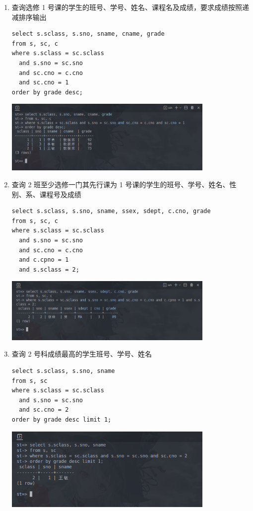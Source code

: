 \documentclass[hyperref,UTF8,12pt,a4paper]{ctexart}
\begin{document}
\begin{enumerate}
\item 查询选修 1 号课的学生的班号、学号、姓名、课程名及成绩，要求成绩按照递减排序输出

\begin{verbatim}
select s.sclass, s.sno, sname, cname, grade
from s, sc, c
where s.sclass = sc.sclass
  and s.sno = sc.sno
  and sc.cno = c.cno
  and sc.cno = 1
order by grade desc;
\end{verbatim}

\begin{center}
\includegraphics[width=0.8\textwidth]{16.png}
\end{center}

\item 查询 2 班至少选修一门其先行课为 1 号课的学生的班号、学号、姓名、性别、系、课程号及成绩

\begin{verbatim}
select s.sclass, s.sno, sname, ssex, sdept, c.cno, grade
from s, sc, c
where s.sclass = sc.sclass
  and s.sno = sc.sno
  and sc.cno = c.cno
  and c.cpno = 1
  and s.sclass = 2;
\end{verbatim}

\begin{center}
\includegraphics[width=0.8\textwidth]{17.png}
\end{center}

\item 查询 2 号科成绩最高的学生班号、学号、姓名

\begin{verbatim}
select s.sclass, s.sno, sname
from s, sc
where s.sclass = sc.sclass
  and s.sno = sc.sno
  and sc.cno = 2
order by grade desc limit 1;

\end{verbatim}

\begin{center}
\includegraphics[width=0.8\textwidth]{18.png}
\end{center}


\end{enumerate}
\end{document}
